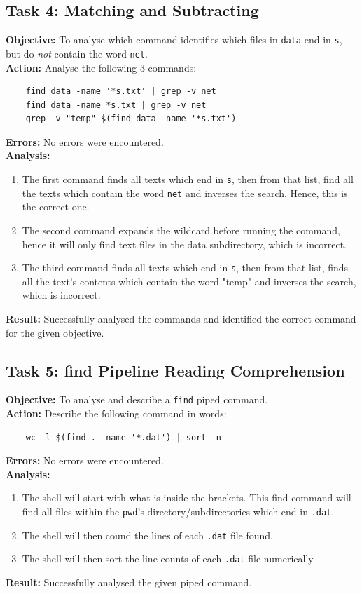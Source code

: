 \documentclass{article}
\begin{document}
\subsection{Task 4: Matching and Subtracting}
%
\textbf{Objective:} To analyse which command identifies which files in \texttt{data} end in \texttt{s}, but do \textit{not} contain the word \texttt{net}.\\
\textbf{Action:} Analyse the following 3 commands:
\begin{verbatim}
    find data -name '*s.txt' | grep -v net
    find data -name *s.txt | grep -v net
    grep -v "temp" $(find data -name '*s.txt')
\end{verbatim}
\textbf{Errors:} No errors were encountered.\\
\textbf{Analysis:}
\begin{enumerate}
    \item The first command finds all texts which end in \texttt{s}, then from that list, find all the texts which contain the word \texttt{net} and inverses the search. Hence, this is the correct one.
    \item The second command expands the wildcard before running the command, hence it will only find text files in the data subdirectory, which is incorrect.
    \item The third command finds all texts which end in \texttt{s}, then from that list, finds all the text's contents which contain the word "temp" and inverses the search, which is incorrect.
\end{enumerate}
\textbf{Result:} Successfully analysed the commands and identified the correct command for the given objective.
%
\subsection{Task 5: find Pipeline Reading Comprehension}
%
\textbf{Objective:} To analyse and describe a \texttt{find} piped command.\\
\textbf{Action:} Describe the following command in words:
\begin{verbatim}
    wc -l $(find . -name '*.dat') | sort -n
\end{verbatim}
\textbf{Errors:} No errors were encountered.\\
\textbf{Analysis:} 
\begin{enumerate}
    \item The shell will start with what is inside the brackets. This find command will find all files within the \texttt{pwd}'s directory/subdirectories which end in \texttt{.dat}.
    \item The shell will then cound the lines of each \texttt{.dat} file found.
    \item The shell will then sort the line counts of each \texttt{.dat} file numerically.
\end{enumerate}
\textbf{Result:} Successfully analysed the given piped command.
%
\end{document}
